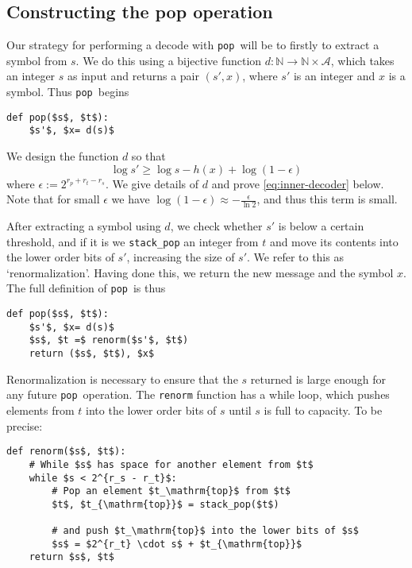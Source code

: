 \documentclass{article}
\newcommand{\pop}{\texttt{pop}}
\begin{document}
\subsection*{Constructing the pop operation}
Our strategy for performing a decode with \pop\ will be to firstly to extract a
symbol from $s$. We do this using a bijective function $d:\mathbb
N\rightarrow\mathbb N\times\mathcal{A}$, which takes an integer $s$ as input
and returns a pair $(s', x)$, where $s'$ is an integer and $x$ is a symbol.
Thus \pop\ begins
\begin{lstlisting}
def pop($s$, $t$):
    $s'$, $x= d(s)$
\end{lstlisting}
We design the function $d$ so that
\begin{equation}\label{eq:inner-decoder}
  \log s'\geq\log s - h(x) + \log (1 - \epsilon)
\end{equation}
where $\epsilon := 2^{r_p + r_t - r_s}$. We give details of $d$ and prove
\cref{eq:inner-decoder} below. Note that for small $\epsilon$ we have $\log (1
- \epsilon) \approx -\frac{\epsilon}{\ln2}$, and thus this term is small.

After extracting a symbol using $d$, we check whether $s'$ is below a certain
threshold, and if it is we \texttt{stack\_pop} an integer from $t$ and move its
contents into the lower order bits of $s'$, increasing the size of $s'$. We
refer to this as `renormalization'. Having done this, we return the new message
and the symbol $x$. The full definition of \pop\ is thus
\begin{lstlisting}
def pop($s$, $t$):
    $s'$, $x= d(s)$
    $s$, $t =$ renorm($s'$, $t$)
    return ($s$, $t$), $x$
\end{lstlisting}

Renormalization is necessary to ensure that the $s$ returned is large enough
for any future \pop\ operation. The \texttt{renorm} function has a while loop,
which pushes elements from $t$ into the lower order bits of $s$ until $s$ is
full to capacity. To be precise:

\begin{lstlisting}
def renorm($s$, $t$):
    # While $s$ has space for another element from $t$
    while $s < 2^{r_s - r_t}$:
        # Pop an element $t_\mathrm{top}$ from $t$
        $t$, $t_{\mathrm{top}}$ = stack_pop($t$)

        # and push $t_\mathrm{top}$ into the lower bits of $s$
        $s$ = $2^{r_t} \cdot s$ + $t_{\mathrm{top}}$
    return $s$, $t$
\end{lstlisting}
\end{document}
